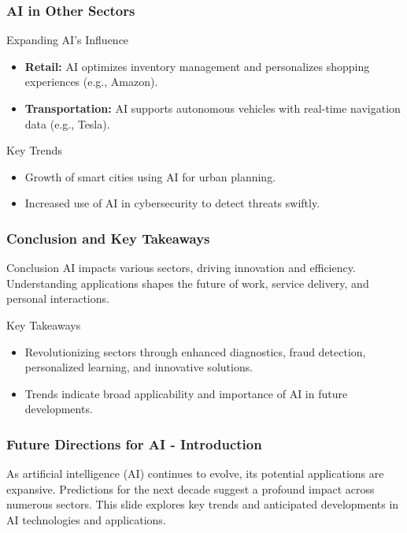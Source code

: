 \documentclass{beamer}
\begin{document}
\begin{frame}[fragile]
    \frametitle{AI in Other Sectors}
    \begin{block}{Expanding AI's Influence}
        \begin{itemize}
            \item \textbf{Retail:} AI optimizes inventory management and personalizes shopping experiences (e.g., Amazon).
            \item \textbf{Transportation:} AI supports autonomous vehicles with real-time navigation data (e.g., Tesla).
        \end{itemize}
    \end{block}
    
    \begin{block}{Key Trends}
        \begin{itemize}
            \item Growth of smart cities using AI for urban planning.
            \item Increased use of AI in cybersecurity to detect threats swiftly.
        \end{itemize}
    \end{block}
\end{frame}

\begin{frame}[fragile]
    \frametitle{Conclusion and Key Takeaways}
    \begin{block}{Conclusion}
        AI impacts various sectors, driving innovation and efficiency. Understanding applications shapes the future of work, service delivery, and personal interactions.
    \end{block}
    
    \begin{block}{Key Takeaways}
        \begin{itemize}
            \item Revolutionizing sectors through enhanced diagnostics, fraud detection, personalized learning, and innovative solutions.
            \item Trends indicate broad applicability and importance of AI in future developments.
        \end{itemize}
    \end{block}
\end{frame}

\begin{frame}[fragile]
    \frametitle{Future Directions for AI - Introduction}
    As artificial intelligence (AI) continues to evolve, its potential applications are expansive. Predictions for the next decade suggest a profound impact across numerous sectors. This slide explores key trends and anticipated developments in AI technologies and applications.
\end{frame}
\end{document}
